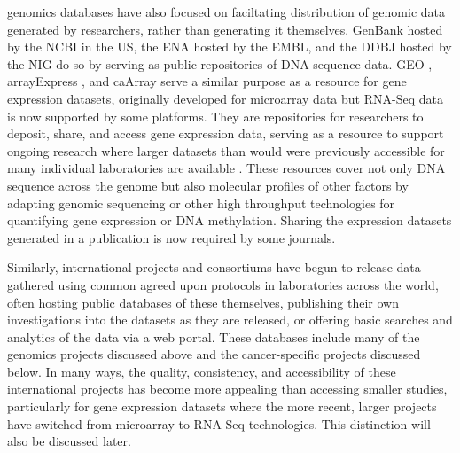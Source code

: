 \Gls{genomics} databases have also focused on faciltating distribution of genomic data generated by researchers, rather than generating it themselves. GenBank hosted by the \gls{NCBI} in the US, the \gls{ENA} hosted by the \gls{EMBL}, and the \gls{DDBJ} hosted by the \gls{NIG} do so by serving as public repositories of DNA sequence data. \gls{GEO} \citep{GEO2016}, arrayExpress \citep{ArrayExpress2013}, and caArray \citep{caArray2014} serve a similar purpose as a resource for gene expression datasets, originally developed for microarray data but \gls{RNA-Seq} data is now supported by some platforms. They are repositories for researchers to deposit, share, and access gene expression data, serving as a resource to support ongoing research where larger datasets than would were previously accessible for many individual laboratories are available \citep{Rung2013}. These resources cover not only DNA sequence across the genome but also molecular profiles of other factors by adapting genomic sequencing or other high throughput technologies for quantifying gene expression or DNA methylation. Sharing the expression datasets generated in a publication is now required by some journals.

Similarly, international projects and consortiums have begun to release data gathered using common agreed upon protocols in laboratories across the world, often hosting public databases of these themselves, publishing their own investigations into the datasets as they are released, or offering basic searches and analytics of the data via a web portal. These databases include many of the \gls{genomics} projects discussed above and the cancer-specific projects discussed below. In many ways, the quality, consistency, and accessibility of these international projects has become more appealing than accessing smaller studies, particularly for gene expression datasets where the more recent, larger projects have switched from microarray to \gls{RNA-Seq} technologies. This distinction will also be discussed later.

